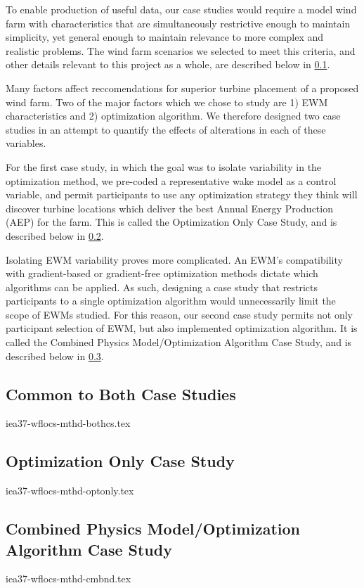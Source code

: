 			
To enable production of useful data, our case studies would require a model wind farm with characteristics that are simultaneously restrictive enough to maintain simplicity, yet general enough to maintain relevance to more complex and realistic problems.
The wind farm scenarios we selected to meet this criteria, and other details relevant to this project as a whole, are described below in \cref{sec:windfarm}.

Many factors affect reccomendations for superior turbine placement of a proposed wind farm.
Two of the major factors which we chose to study are
1) EWM characteristics and 2) optimization algorithm.\cite{HerbertAcero2014}
We therefore designed two case studies in an attempt to quantify the effects of alterations in each of these variables.

For the first case study, in which the goal was to isolate variability in the optimization method, we pre-coded a representative wake model as a control variable,
and permit participants to use any optimization strategy they think will discover turbine locations which deliver the best Annual Energy Production (AEP) for the farm.
This is called the Optimization Only Case Study, and is described below in \cref{sec:optonly}.

Isolating EWM variability proves more complicated.
An EWM's compatibility with gradient-based or gradient-free optimization methods dictate which algorithms can be applied.
As such, designing a case study that restricts participants to a single optimization algorithm would unnecessarily limit the scope of EWMs studied.
For this reason, our second case study permits not only participant selection of EWM, but also implemented optimization algorithm.
It is called the Combined Physics Model/Optimization Algorithm Case Study, and is described below in \cref{sec:cmbnd}.

\bigskip
\subsection{Common to Both Case Studies} \label{sec:windfarm}

	{iea37-wflocs-mthd-bothcs.tex}
	
\subsection{Optimization Only Case Study} \label{sec:optonly}

	{iea37-wflocs-mthd-optonly.tex}

\subsection{Combined Physics Model/Optimization Algorithm Case Study} \label{sec:cmbnd}

	{iea37-wflocs-mthd-cmbnd.tex}